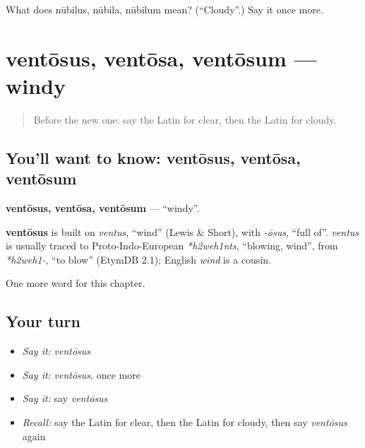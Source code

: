 \begin{tcolorbox}[breakable,colback=teal!4,colframe=teal!35!black,title={Before you move on}]
What does nūbilus, nūbila, nūbilum mean? (\textquotedblleft{}Cloudy\textquotedblright{}.) Say it once more.
\end{tcolorbox}
\section[ventōsus, ventōsa, ventōsum]{ventōsus, ventōsa, ventōsum — windy}

\label{lesson:LA-C153-ventosus}



\begin{quote}
Before the new one: say the Latin for clear, then the Latin for cloudy.
\end{quote}

\subsection*{You'll want to know: ventōsus, ventōsa, ventōsum}
\textbf{ventōsus, ventōsa, ventōsum} — \textquotedblleft{}windy\textquotedblright{}.

\begin{cousinweb}
\textbf{ventōsus} is built on \emph{ventus}, \textquotedblleft{}wind\textquotedblright{} (Lewis \& Short), with \emph{-ōsus}, \textquotedblleft{}full of\textquotedblright{}. \emph{ventus} is usually traced to Proto-Indo-European \emph{*h2weh1nts}, \textquotedblleft{}blowing, wind\textquotedblright{}, from \emph{*h2weh1-}, \textquotedblleft{}to blow\textquotedblright{} (EtymDB 2.1); English \emph{wind} is a cousin.
\end{cousinweb}

\begin{grammarlens}[title={What you've built}]
One more word for this chapter.
\end{grammarlens}

\subsection*{Your turn}
\begin{itemize}
\raggedright
  \item \emph{Say it:} \emph{ventōsus}
  \item \emph{Say it:} \emph{ventōsus}, once more
  \item \emph{Say it:} say \emph{ventōsus}
  \item \emph{Recall:} say the Latin for clear, then the Latin for cloudy, then say \emph{ventōsus} again
\end{itemize}

